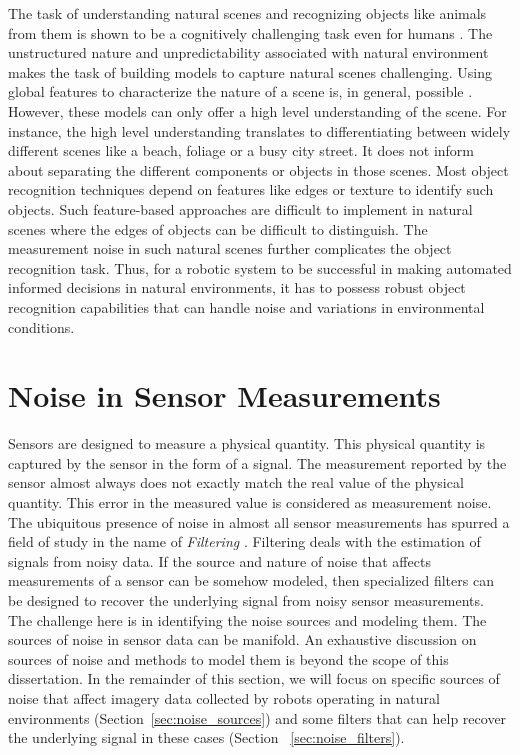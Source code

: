 The task of understanding natural scenes and recognizing objects like animals from them is shown to be a cognitively challenging task 
even for humans \cite{wichmann}. The unstructured nature and unpredictability associated with natural environment makes the task of 
building models to capture natural scenes challenging.
Using global features to characterize the nature of a scene is, in general, possible \cite{olivia}. However, these models can only offer a high level understanding
of the scene. For instance, the high level understanding translates to differentiating between widely different scenes like a beach, foliage or a busy city street. It does not inform about separating the different components or objects in those scenes. Most object recognition techniques depend on features like edges or texture to identify such objects. Such feature-based approaches are difficult to implement in natural scenes where the edges of objects can be difficult to distinguish.
The measurement noise in such natural scenes further complicates the object recognition task. 
Thus, for a robotic system to be
successful in making automated informed decisions in natural environments, it has to possess robust object recognition capabilities that can handle noise and variations in environmental conditions.


\section{Noise in Sensor Measurements}

Sensors are designed to measure a physical quantity. This physical quantity is captured by the sensor in the form of a signal.
The measurement reported by the sensor almost always does not exactly match the real value of the physical quantity.
This error in the measured value is considered as measurement noise.
The ubiquitous presence of noise in almost all sensor measurements has spurred a field of study in the name of 
\emph{Filtering} \cite{haykin}. Filtering deals with the estimation of signals from noisy data. 
If the source and nature of noise that affects measurements of a sensor can be somehow modeled, then specialized
filters can be designed to recover the underlying signal from noisy sensor measurements.
The challenge here is in identifying the noise sources and modeling them. 
The sources of noise in sensor data can be manifold. An exhaustive discussion on sources of noise and methods to model them
is beyond the scope of this dissertation. In the remainder of this section, we will focus on specific sources of noise that affect 
imagery data collected by robots operating in natural environments (Section~\ref{sec:noise_sources}) and some filters that can 
help recover the underlying signal in these cases (Section ~\ref{sec:noise_filters}).


